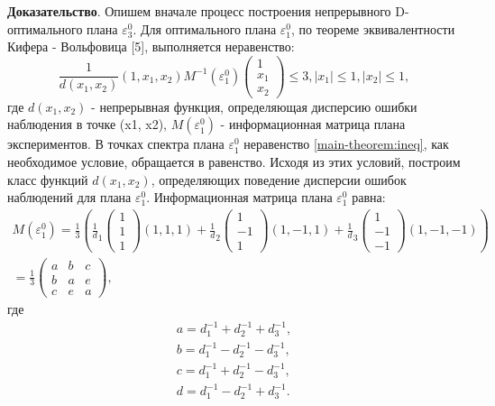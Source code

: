 \textbf{Доказательство}.
Опишем вначале процесс построения непрерывного D-оптимального плана $\varepsilon_3^0$.
Для оптимального плана  $\varepsilon_1^{0}$, по теореме эквивалентности Кифера - Вольфовица [5], выполняется неравенство:
\begin{equation}\label{main-theorem:ineq}
\frac 1 {d(x_1, x_2)}
(1, x_1, x_2)
M^{-1}(\varepsilon_1^0)
\begin{pmatrix}1 \\ x_1 \\ x_2 \end{pmatrix} \le 3,
|x_1| \le 1, |x_2| \le 1,
\end{equation}
где $d(x_1, x_2)$ - непрерывная функция, определяющая дисперсию ошибки наблюдения в точке (x1, x2), $M(\varepsilon_1^{0})$ - информационная матрица плана экспериментов. В точках спектра плана $\varepsilon_1^{0}$ неравенство \eqref{main-theorem:ineq}, как необходимое условие, обращается в равенство. Исходя из этих условий, построим класс функций $d(x_1, x_2)$, определяющих поведение дисперсии ошибок наблюдений  для плана $\varepsilon_1^{0}$. Информационная матрица плана $\varepsilon_1^{0}$ равна:
\begin{gather*}
M(\varepsilon_1^0) = \frac 1 3 \left(
\frac 1 d_1 \begin{pmatrix} 1 \\ 1 \\ 1 \end{pmatrix} (1, 1, 1) + 
\frac 1 d_2 \begin{pmatrix} 1 \\ -1 \\ 1 \end{pmatrix} (1, -1, 1) + 
\frac 1 d_3 \begin{pmatrix} 1 \\ -1 \\ -1 \end{pmatrix} (1, -1, -1)
\right) \\ =
\frac 1 3 
\begin{pmatrix}
a & b & c \\
b & a & e \\
c & e & a
\end{pmatrix},
\end{gather*}
где
\begin{equation}\label{main-theorem:defs} \begin{split}
a=d_1^{-1}+d_2^{-1}+d_3^{-1},\\
b=d_1^{-1}-d_2^{-1}-d_3^{-1},\\
c=d_1^{-1}+d_2^{-1}-d_3^{-1},\\
d=d_1^{-1}-d_2^{-1}+d_3^{-1}.
\end{split}\end{equation}
